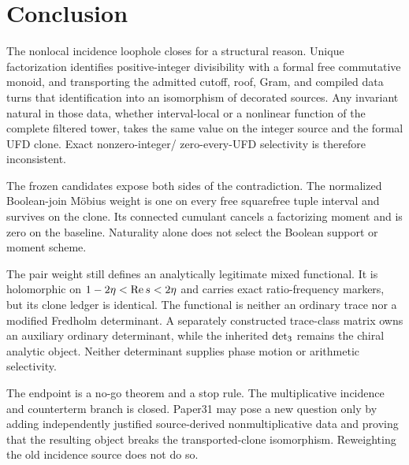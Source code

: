 \section{Conclusion}
\label{sec:conclusion}

The nonlocal incidence loophole closes for a structural reason.  Unique
factorization identifies positive-integer divisibility with a formal free
commutative monoid, and transporting the admitted cutoff, roof, Gram, and
compiled data turns that identification into an isomorphism of decorated
sources.  Any invariant natural in those data, whether interval-local or a
nonlinear function of the complete filtered tower, takes the same value on
the integer source and the formal UFD clone.  Exact nonzero-integer/
zero-every-UFD selectivity is therefore inconsistent.

The frozen candidates expose both sides of the contradiction.  The
normalized Boolean-join M{\"o}bius weight is one on every free squarefree
tuple interval and survives on the clone.  Its connected cumulant cancels a
factorizing moment and is zero on the baseline.  Naturality alone does not
select the Boolean support or moment scheme.

The pair weight still defines an analytically legitimate mixed functional.
It is holomorphic on \(1-2\eta<\operatorname{Re} s<2\eta\) and carries exact
ratio-frequency markers, but its clone ledger is identical.  The functional
is neither an ordinary trace nor a modified Fredholm determinant.  A
separately constructed trace-class matrix owns an auxiliary ordinary
determinant, while the inherited \(\det_{3}\) remains the chiral analytic
object.  Neither determinant supplies phase motion or arithmetic selectivity.

The endpoint is a no-go theorem and a stop rule.  The multiplicative
incidence and counterterm branch is closed.  Paper31 may pose a new
question only by adding independently justified source-derived
nonmultiplicative data and proving that the resulting object breaks the
transported-clone isomorphism.  Reweighting the old incidence source does not
do so.
